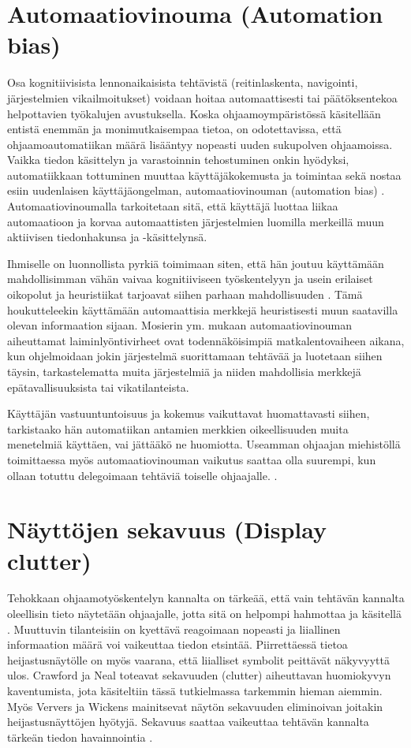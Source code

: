 \documentclass[utf8,bachelor,manualbib]{gradu3}
\begin{document}
\section{Automaatiovinouma (Automation bias)}

Osa kognitiivisista lennonaikaisista tehtävistä (reitinlaskenta, navigointi, järjestelmien vikailmoitukset) voidaan hoitaa automaattisesti tai päätöksentekoa helpottavien työkalujen avustuksella. Koska ohjaamoympäristössä käsitellään entistä enemmän ja monimutkaisempaa tietoa, on odotettavissa, että ohjaamoautomatiikan määrä lisääntyy nopeasti uuden sukupolven ohjaamoissa. Vaikka tiedon käsittelyn ja varastoinnin tehostuminen onkin hyödyksi, automatiikkaan tottuminen muuttaa käyttäjäkokemusta ja toimintaa sekä nostaa esiin uudenlaisen käyttäjäongelman, automaatiovinouman (automation bias) \citep{mosierym1998}. Automaatiovinoumalla tarkoitetaan sitä, että käyttäjä luottaa liikaa automaatioon ja korvaa automaattisten järjestelmien luomilla merkeillä muun aktiivisen tiedonhakunsa ja -käsittelynsä.

Ihmiselle on luonnollista pyrkiä toimimaan siten, että hän joutuu käyttämään mahdollisimman vähän vaivaa kognitiiviseen työskentelyyn ja usein erilaiset oikopolut ja heuristiikat tarjoavat siihen parhaan mahdollisuuden \citep{fisketaylor1994}. Tämä houkutteleekin käyttämään automaattisia merkkejä heuristisesti muun saatavilla olevan informaation sijaan. Mosierin ym. \citeyearpar{mosierym1994} mukaan automaatiovinouman aiheuttamat laiminlyöntivirheet ovat todennäköisimpiä matkalentovaiheen aikana, kun ohjelmoidaan jokin järjestelmä suorittamaan tehtävää ja luotetaan siihen täysin, tarkastelematta muita järjestelmiä ja niiden  mahdollisia merkkejä epätavallisuuksista tai vikatilanteista.

Käyttäjän vastuuntuntoisuus ja kokemus vaikuttavat huomattavasti siihen, tarkistaako hän automatiikan antamien merkkien oikeellisuuden muita menetelmiä käyttäen, vai jättääkö ne huomiotta. Useamman ohjaajan miehistöllä toimittaessa myös automaatiovinouman vaikutus saattaa olla suurempi, kun ollaan totuttu delegoimaan tehtäviä toiselle ohjaajalle. \citep{mosierym1998}.

\section{Näyttöjen sekavuus (Display clutter)}

Tehokkaan ohjaamotyöskentelyn kannalta on tärkeää, että vain tehtävän kannalta oleellisin tieto näytetään ohjaajalle, jotta sitä on helpompi hahmottaa ja käsitellä \citep{ververswickens1998}. Muuttuvin tilanteisiin on kyettävä reagoimaan nopeasti ja liiallinen informaation määrä voi vaikeuttaa tiedon etsintää. Piirrettäessä tietoa heijastusnäytölle on myös vaarana, että liialliset symbolit peittävät näkyvyyttä ulos. Crawford ja Neal \citeyearpar{crawfordneal2006} toteavat sekavuuden (clutter) aiheuttavan huomiokyvyn kaventumista, jota käsiteltiin tässä tutkielmassa tarkemmin hieman aiemmin. Myös Ververs ja Wickens \citeyearpar{ververswickens1996} mainitsevat näytön sekavuuden eliminoivan joitakin heijastusnäyttöjen hyötyjä. Sekavuus saattaa vaikeuttaa tehtävän kannalta tärkeän tiedon havainnointia \citep{nikolicym2004, stelzerwickens2006, wickensym2003}.
\end{document}

